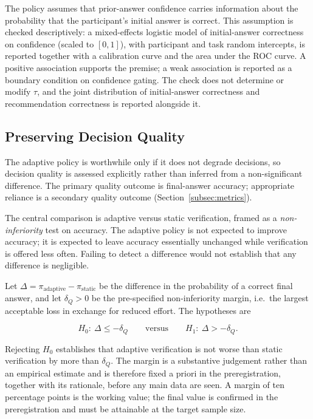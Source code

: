 \documentclass[oneside,final,14pt,a4paper]{extreport}
\begin{document}
The policy assumes that prior-answer confidence carries information about the
probability that the participant's initial answer is correct. This assumption
is checked descriptively: a mixed-effects logistic model of initial-answer
correctness on confidence (scaled to $[0,1]$), with participant and task random
intercepts, is reported together with a calibration curve and the area under
the ROC curve. A positive association supports the premise; a weak association
is reported as a boundary condition on confidence gating. The check does not
determine or modify $\tau$, and the joint distribution of initial-answer
correctness and recommendation correctness is reported alongside it.

\subsection{Preserving Decision Quality}
\label{subsec:quality}

The adaptive policy is worthwhile only if it does not degrade decisions, so
decision quality is assessed explicitly rather than inferred from a
non-significant difference. The primary quality outcome is final-answer
accuracy; appropriate reliance is a secondary quality outcome
(Section~\ref{subsec:metrics}).

The central comparison is adaptive versus static verification, framed as a
\emph{non-inferiority} test on accuracy. The adaptive policy is not expected to
improve accuracy; it is expected to leave accuracy essentially unchanged while
verification is offered less often. Failing to detect a difference would not
establish that any difference is negligible.

Let $\Delta = \pi_{\mathrm{adaptive}} - \pi_{\mathrm{static}}$ be the difference
in the probability of a correct final answer, and let $\delta_Q>0$ be the
pre-specified non-inferiority margin, i.e.\ the largest acceptable loss in
exchange for reduced effort. The hypotheses are

$$
H_0:\ \Delta \le -\delta_Q
\qquad\text{versus}\qquad
H_1:\ \Delta > -\delta_Q .
$$

Rejecting $H_0$ establishes that adaptive verification is not worse than static
verification by more than $\delta_Q$. The margin is a substantive judgement
rather than an empirical estimate and is therefore fixed a priori in the
preregistration, together with its rationale, before any main data are seen. A
margin of ten percentage points is the working value; the final value is
confirmed in the preregistration and must be attainable at the target sample
size.
\end{document}
